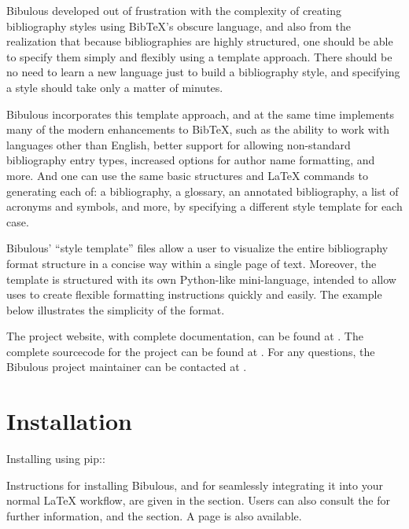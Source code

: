 \documentclass[letterpaper,10pt,english]{sphinxmanual}
\begin{document}
Bibulous developed out of frustration with the complexity of creating bibliography styles using BibTeX’s obscure language, and also from the realization that because bibliographies are highly structured, one should be able to specify them simply and flexibly using a template approach. There should be no need to learn a new language just to build a bibliography style, and specifying a style should take only a matter of minutes.

Bibulous incorporates this template approach, and at the same time implements many of the modern enhancements to BibTeX, such as the ability to work with languages other than English, better support for allowing non-standard bibliography entry types, increased options for author name formatting, and more. And one can use the same basic structures and LaTeX commands to generating each of: a bibliography, a glossary, an annotated bibliography, a list of acronyms and symbols, and more, by specifying a different style template for each case.

Bibulous’ “style template” files allow a user to visualize the entire bibliography format structure in a concise way within a single page of text. Moreover, the template is structured with its own Python-like mini-language, intended to allow uses to create flexible formatting instructions quickly and easily. The example below illustrates the simplicity of the format.

The project website, with complete documentation, can be found at . The complete sourcecode for the project can be found at . For any questions, the Bibulous project maintainer can be contacted at .


\section{Installation}
\label{\detokenize{index:installation}}
Installing using pip::

%
\begin{sphinxVerbatim}[commandchars=\\\{\}]
  
\end{sphinxVerbatim}

Instructions for installing Bibulous, and for seamlessly integrating it into your normal LaTeX workflow, are given in the  section.
Users can also consult the  for further information, and the  section. A  page is also available.
\end{document}
